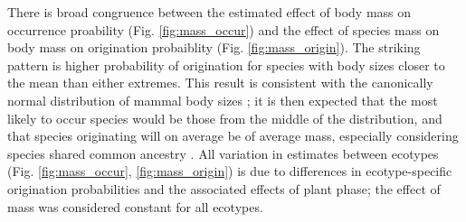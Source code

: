 \documentclass[12pt,letterpaper]{article}
\begin{document}

There is broad congruence between the estimated effect of body mass on occurrence proability (Fig. \ref{fig:mass_occur}) and the effect of species mass on body mass on origination probaiblity (Fig. \ref{fig:mass_origin}). The striking pattern is higher probability of origination for species with body sizes closer to the mean than either extremes. This result is consistent with the canonically normal distribution of mammal body sizes \citep{Smith2004}; it is then expected that the most likely to occur species would be those from the middle of the distribution, and that species originating will on average be of average mass, especially considering species shared common ancestry \citep{Felsenstein1985b}. All variation in estimates between ecotypes (Fig. \ref{fig:mass_occur}, \ref{fig:mass_origin}) is due to differences in ecotype-specific origination probabilities and the associated effects of plant phase; the effect of mass was considered constant for all ecotypes.
\end{document}
